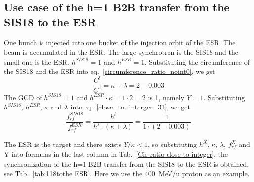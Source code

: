 \subsection{Use case of the h=1 B2B transfer from the SIS18 to the ESR} 
One bunch is injected into one bucket of the injection orbit of the ESR. The beam is accumulated in the ESR. The large synchrotron is the SIS18 and the small one is the ESR. $h^{\mathit{SIS18}}=1$ and $h^{\mathit{ESR}}=1$. Substituting the circumference of the SIS18 and the ESR into eq.~\ref{circumference_ratio_noint0}, we get
\begin{equation}
\frac{C^l}{C^s}=\kappa + \lambda =2-0.003
\end{equation}
The GCD of $h^{\mathit{SIS18}}=1$ and $h^{\mathit{ESR}}\cdot \kappa=1\cdot 2=2$ is 1, namely $Y=1$. Substituting $h^{\mathit{SIS18}}$, $h^{\mathit{ESR}}$, $\kappa$ and $\lambda$ into eq.~\ref{close_to_interger_31}, we get
\begin{equation}
\frac {f_{\mathit{rf}}^{\mathit{SIS18}}}{f_{\mathit{rf}}^{\mathit{ESR}}}= \frac{h^l}{h^s \cdot (\kappa+ \lambda)}=\frac {1}{1 \cdot(2-0.003)}
\end{equation}

The ESR is the target and there exists $Y/\kappa<1$, so substituting $h^X$, $\kappa$, $\lambda$, $f_{\mathit{rf}}^{X}$ and Y into formulas in the last column in Tab.~\ref{Cir ratio close to integer}, the synchronization of the h=1 B2B transfer from the SIS18 to the ESR is obtained, see Tab.~\ref{tab:118tothe ESR}. Here we use the \SI{400}{MeV/\atomicmassunit} proton as an example. 

